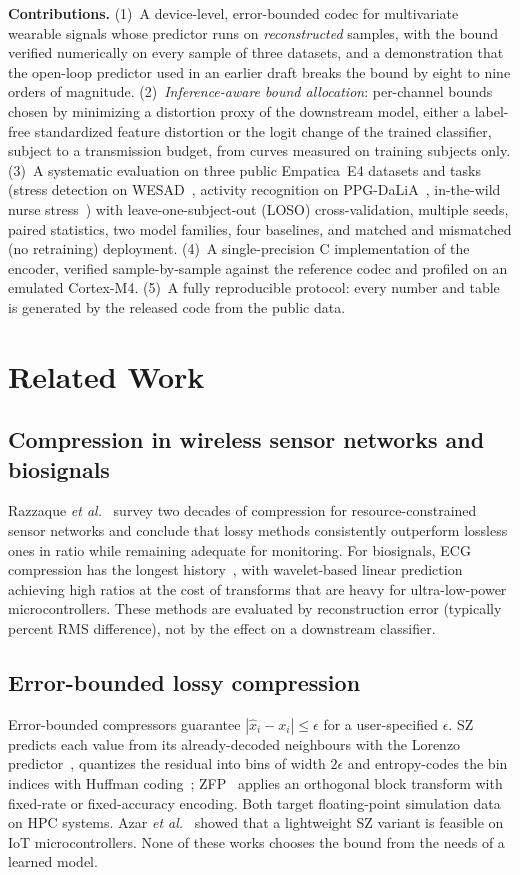 \documentclass[journal,twoside,web]{ieeecolor}
\begin{document}
\textbf{Contributions.} (1)~A device-level, error-bounded codec for multivariate wearable signals whose predictor runs on \emph{reconstructed} samples, with the bound verified numerically on every sample of three datasets, and a demonstration that the open-loop predictor used in an earlier draft breaks the bound by eight to nine orders of magnitude. (2)~\emph{Inference-aware bound allocation}: per-channel bounds chosen by minimizing a distortion proxy of the downstream model, either a label-free standardized feature distortion or the logit change of the trained classifier, subject to a transmission budget, from curves measured on training subjects only. (3)~A systematic evaluation on three public Empatica~E4 datasets and tasks (stress detection on WESAD~\cite{schmidt2018}, activity recognition on PPG-DaLiA~\cite{reiss2019}, in-the-wild nurse stress~\cite{hosseini2022}) with leave-one-subject-out (LOSO) cross-validation, multiple seeds, paired statistics, two model families, four baselines, and matched and mismatched (no retraining) deployment. (4)~A single-precision C implementation of the encoder, verified sample-by-sample against the reference codec and profiled on an emulated Cortex-M4. (5)~A fully reproducible protocol: every number and table is generated by the released code from the public data.

\section{Related Work}
\subsection{Compression in wireless sensor networks and biosignals}
Razzaque \emph{et al.}~\cite{razzaque2013} survey two decades of compression for resource-constrained sensor networks and conclude that lossy methods consistently outperform lossless ones in ratio while remaining adequate for monitoring. For biosignals, ECG compression has the longest history~\cite{jalaleddine1990}, with wavelet-based linear prediction~\cite{ramakrishnan1997} achieving high ratios at the cost of transforms that are heavy for ultra-low-power microcontrollers. These methods are evaluated by reconstruction error (typically percent RMS difference), not by the effect on a downstream classifier.

\subsection{Error-bounded lossy compression}
Error-bounded compressors guarantee $|\hat{x}_i-x_i|\le\epsilon$ for a user-specified $\epsilon$. SZ~\cite{di2016,tao2017,liang2018} predicts each value from its already-decoded neighbours with the Lorenzo predictor~\cite{ibarria2003}, quantizes the residual into bins of width $2\epsilon$ and entropy-codes the bin indices with Huffman coding~\cite{huffman1952}; ZFP~\cite{lindstrom2014} applies an orthogonal block transform with fixed-rate or fixed-accuracy encoding. Both target floating-point simulation data on HPC systems. Azar \emph{et al.}~\cite{azar2022} showed that a lightweight SZ variant is feasible on IoT microcontrollers. None of these works chooses the bound from the needs of a learned model.
\end{document}
